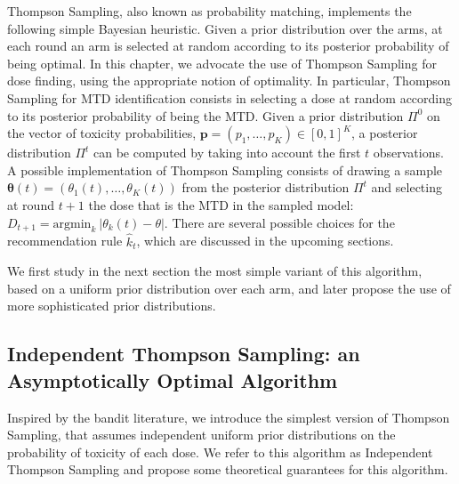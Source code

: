 


Thompson Sampling, also known as probability matching, implements the following simple Bayesian heuristic. Given a prior distribution over the arms, at each round an arm is selected at random according to its posterior probability of being optimal. In this chapter, we advocate the use of Thompson Sampling for dose finding, using the appropriate notion of optimality. In particular, Thompson Sampling for MTD identification consists in selecting a dose at random according to its posterior probability of being the MTD. Given a prior distribution $\Pi^0$ on the vector of toxicity probabilities, $\bm p = (p_1,\dots,p_K) \in [0,1]^K$, a posterior distribution $\Pi^t$ can be computed by taking into account the first $t$ observations. A possible implementation of Thompson Sampling consists of drawing a sample $\bm \theta(t) = (\theta_1(t),\dots,\theta_K(t))$ from the posterior distribution $\Pi^t$ and selecting at round $t+1$ the dose that is the MTD in the sampled model: $D_{t+1} = \text{argmin}_{k} \ |\theta_k(t) - \theta|$. There are several possible choices for the recommendation rule $\hat k_t$, which are discussed in the upcoming sections.

We first study in the next section the most simple variant of this algorithm, based on a uniform prior distribution over each arm, and later propose the use of more sophisticated prior distributions. 


\subsection{Independent Thompson Sampling: an Asymptotically Optimal Algorithm} \label{sec:Analysis}

Inspired by the bandit literature, we introduce the simplest version of Thompson Sampling, that assumes independent uniform prior distributions  on the probability of toxicity of each dose. We refer to this algorithm as {Independent Thompson Sampling} and propose some theoretical guarantees for this algorithm.


